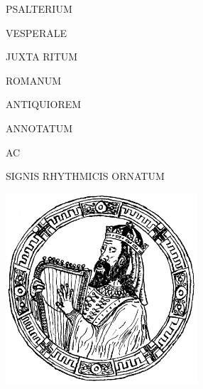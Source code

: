 \documentclass[12pt]{article} %
\begin{document}


\vspace*{35 pt}

\begin{center}

\color{benred8}

{\fontsize{2.660cm}{5 em}\selectfont

PSALTERIUM

}

\vspace*{15 pt}

{\fontsize{2.975cm}{5 em}\selectfont

VESPERALE

}

\vspace*{20 pt}

{\fontsize{1.5cm}{1 em}\selectfont

JUXTA RITUM

\vspace*{2.7 mm}

ROMANUM

\vspace*{5 mm}

ANTIQUIOREM

}

\vspace*{10 mm}

\begin{Huge}

ANNOTATUM

\end{Huge}\begin{Large}

AC

\vspace*{-1.0 mm}

\end{Large}\begin{Huge}

SIGNIS RHYTHMICIS ORNATUM

\end{Huge}

\vspace*{3 mm}

\includegraphics[height=7.06cm]{David2015.png}


\end{center}
\end{document}
